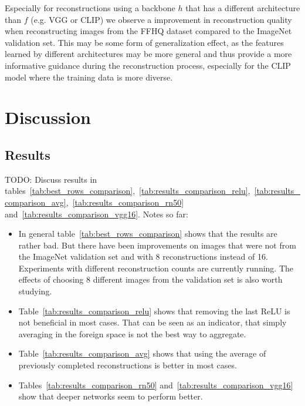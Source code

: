 \documentclass[10pt,twocolumn]{article}
\begin{document}
Especially for reconstructions using a backbone $h$ that has a different architecture than $f$ (e.g. VGG or CLIP) we observe a improvement in reconstruction quality when reconstructing images from the FFHQ dataset compared to the ImageNet validation set.
This may be some form of generalization effect, as the features learned by different architectures may be more general and thus provide a more informative guidance during the reconstruction process, especially for the CLIP model where the training data is more diverse.
\section{Discussion}
\subsection{Results}
TODO: Discuss results in tables~\ref{tab:best_rows_comparison},~\ref{tab:results_comparison_relu},~\ref{tab:results_comparison_avg},~\ref{tab:results_comparison_rn50} and~\ref{tab:results_comparison_vgg16}.
Notes so far:
\begin{itemize}
    \item In general table~\ref{tab:best_rows_comparison} shows that the results are rather bad.
        But there have been improvements on images that were not from the ImageNet validation set and with 8 reconstructions instead of 16.
        Experiments with different reconstruction counts are currently running.
        The effects of choosing 8 different images from the validation set is also worth studying.
    \item Table~\ref{tab:results_comparison_relu} shows that removing the last ReLU is not beneficial in most cases.
        That can be seen as an indicator, that simply averaging in the foreign space is not the best way to aggregate.
    \item Table~\ref{tab:results_comparison_avg} shows that using the average of previously completed reconstructions is better in most cases. 
    \item Tables~\ref{tab:results_comparison_rn50} and~\ref{tab:results_comparison_vgg16} show that deeper networks seem to perform better.
\end{itemize}
\end{document}
